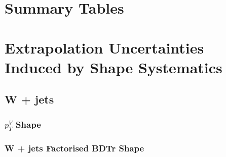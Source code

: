 \section{Summary Tables}



\section{Extrapolation Uncertainties Induced by Shape Systematics}
\subsection{W + jets}
\subsubsection{$p_T^V$ Shape}

\subsubsection{W + jets Factorised BDTr Shape}

